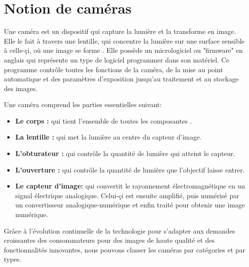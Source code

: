  \newpage
 
 
 \section{Notion de caméras}
 
 Une caméra est un dispositif qui capture la lumière et la transforme en image. Elle le fait à travers une lentille, qui concentre la lumière sur une surface sensible à celle-çi, où une image se forme \cite{noauthor_quest-ce_nodate}. Elle possède un micrologiciel ou "firmware" en anglais qui représente un type de logiciel programmer dans son matériel. Ce programme contrôle toutes les fonctions de la caméra, de la mise au point automatique et des paramètres d’exposition jusqu'au traitement et au stockage des images.
 
 Une caméra comprend les parties essentielles suivant: 
 \begin{itemize}
 	\item \textbf{Le corps :} qui tient l'ensemble de toutes les composantes . 
 	
 	\item \textbf{La lentille :} qui met la lumière au centre du capteur d’image. 
 	
 	\item \textbf{L’obturateur :} qui contrôle la quantité de lumière qui atteint le capteur.
 	
 	\item \textbf{L’ouverture :} qui contrôle la quantité de lumière que l’objectif laisse entrer.
 	
 	\item \textbf{Le capteur d'image:} qui convertit le rayonnement électromagnétique en un signal électrique analogique. Celui-çi est ensuite amplifié, puis numérisé par un convertisseur analogique-numérique et enfin traité pour obtenir une image numérique.  
 \end{itemize}
 
 Grâce à l'évolution continuelle de la technologie pour s'adapter aux demandes croissantes des consommateurs pour des images de haute qualité et des fonctionnalités innovantes, nous pouvons classer les caméras par catégories et par types.
 
